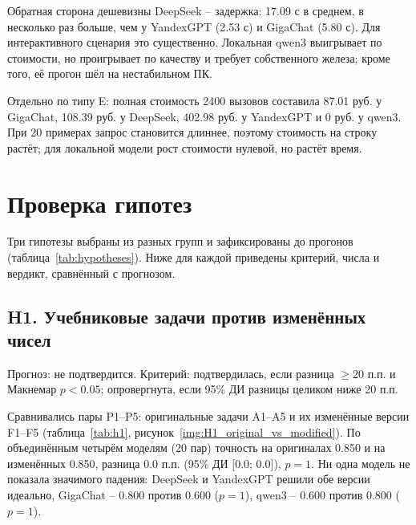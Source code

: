 \documentclass{bmstu}
\begin{document}

Обратная сторона дешевизны DeepSeek -- задержка: 17.09 с в среднем, в несколько раз больше, чем у YandexGPT (2.53 с) и GigaChat (5.80 с). Для интерактивного сценария это существенно. Локальная qwen3 выигрывает по стоимости, но проигрывает по качеству и требует собственного железа; кроме того, её прогон шёл на нестабильном ПК.

Отдельно по типу E: полная стоимость 2400 вызовов составила 87.01 руб. у GigaChat, 108.39 руб. у DeepSeek, 402.98 руб. у YandexGPT и 0 руб. у qwen3. При 20 примерах запрос становится длиннее, поэтому стоимость на строку растёт; для локальной модели рост стоимости нулевой, но растёт время.

\chapter{Проверка гипотез}
\label{ch:hypotheses}

Три гипотезы выбраны из разных групп и зафиксированы до прогонов (таблица~\ref{tab:hypotheses}). Ниже для каждой приведены критерий, числа и вердикт, сравнённый с прогнозом.

\section{H1. Учебниковые задачи против изменённых чисел}
Прогноз: не подтвердится. Критерий: подтвердилась, если разница $\ge20$ п.п. и Макнемар $p<0.05$; опровергнута, если 95\% ДИ разницы целиком ниже 20 п.п.

Сравнивались пары P1--P5: оригинальные задачи A1--A5 и их изменённые версии F1--F5 (таблица~\ref{tab:h1}, рисунок~\ref{img:H1_original_vs_modified}). По объединённым четырём моделям (20 пар) точность на оригиналах 0.850 и на изменённых 0.850, разница 0.0 п.п. (95\% ДИ [0.0; 0.0]), $p=1$. Ни одна модель не показала значимого падения: DeepSeek и YandexGPT решили обе версии идеально, GigaChat -- 0.800 против 0.600 ($p=1$), qwen3 -- 0.600 против 0.800 ($p=1$).

\begin{table}[htbp]
\centering
\caption{H1: точность на оригиналах и изменённых версиях (пары P1--P5)}
\label{tab:h1}
\vspace{-10pt}
\end{table}
\end{document}
